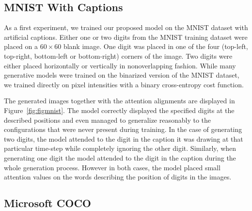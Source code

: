 \documentclass{article} %
\begin{document}
\subsection{MNIST With Captions}
As a first experiment, we trained our proposed model on the MNIST dataset with artificial captions. Either one or two digits from the MNIST training dataset were placed on a $60 \times 60$ blank image. One digit was placed in one of the four (top-left, top-right, bottom-left or bottom-right) corners of the image. Two digits were either placed horizontally or vertically in nonoverlapping fashion. 
While many generative models were trained on the binarized version of the MNIST dataset, we trained directly on pixel intensities with a binary cross-entropy cost function.

The generated images together with the attention alignments are displayed in Figure~\ref{fig:figmnist}. The model correctly displayed the specified digits at the described positions and even managed to generalize reasonably to the configurations that were never present during training. 
In the case of generating two digits, the model attended to the digit in the caption it was drawing at that particular time-step while completely ignoring the other digit. 
Similarly, when generating one digit the model attended to the digit in the caption during the whole generation process. However in both cases, the model placed small attention values on the words describing the position of digits in the images.

\subsection{Microsoft COCO}
\end{document}

